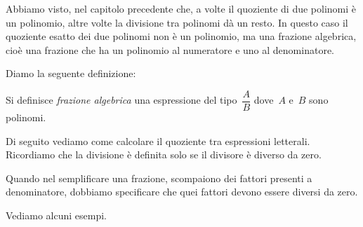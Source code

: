 Abbiamo visto, nel capitolo precedente che, a volte il quoziente di due 
polinomi è un polinomio, altre volte la divisione tra polinomi dà un resto.
In questo caso il quoziente esatto dei due polinomi non è un polinomio, ma 
una frazione algebrica, cioè una frazione che ha un polinomio al numeratore e 
uno al denominatore.

% 

Diamo la seguente definizione:
\begin{definizione}
Si definisce \emph{frazione algebrica} una espressione del 
tipo~\(\dfrac{A}{B}\) dove~\(A\) e~\(B\) sono polinomi.
\end{definizione}

Di seguito vediamo come calcolare il quoziente tra espressioni letterali.
Ricordiamo che la divisione è definita solo se il divisore è diverso da zero.

Quando nel semplificare una frazione, scompaiono dei fattori presenti a 
denominatore, dobbiamo specificare che quei fattori devono essere diversi da 
zero.

Vediamo alcuni esempi.

